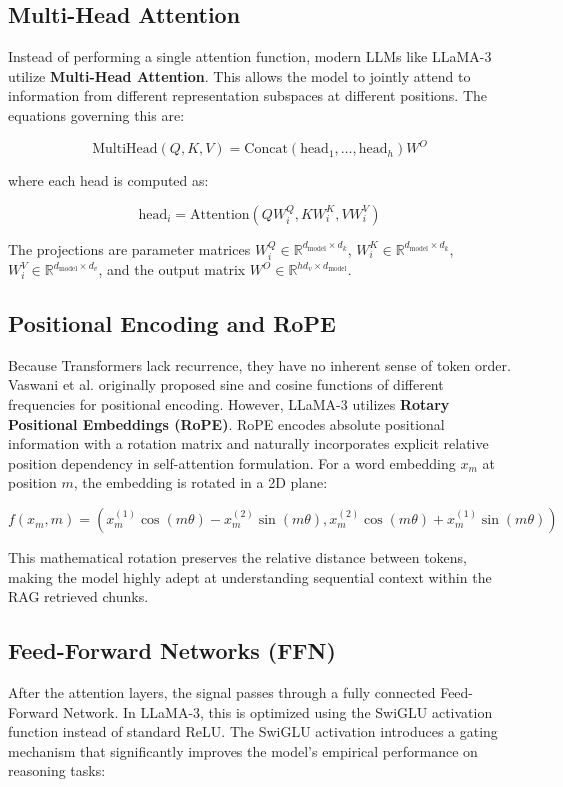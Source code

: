 \documentclass[12pt,a4paper]{report}
\begin{document}
\subsection{Multi-Head Attention}
Instead of performing a single attention function, modern LLMs like LLaMA-3 utilize \textbf{Multi-Head Attention}. This allows the model to jointly attend to information from different representation subspaces at different positions. The equations governing this are:

\begin{equation}
    \text{MultiHead}(Q, K, V) = \text{Concat}(\text{head}_1, \dots, \text{head}_h)W^O
\end{equation}

where each head is computed as:

\begin{equation}
    \text{head}_i = \text{Attention}(QW_i^Q, KW_i^K, VW_i^V)
\end{equation}

The projections are parameter matrices $W_i^Q \in \mathbb{R}^{d_{\text{model}} \times d_k}$, $W_i^K \in \mathbb{R}^{d_{\text{model}} \times d_k}$, $W_i^V \in \mathbb{R}^{d_{\text{model}} \times d_v}$, and the output matrix $W^O \in \mathbb{R}^{hd_v \times d_{\text{model}}}$.

\subsection{Positional Encoding and RoPE}
Because Transformers lack recurrence, they have no inherent sense of token order. Vaswani et al. originally proposed sine and cosine functions of different frequencies for positional encoding. However, LLaMA-3 utilizes \textbf{Rotary Positional Embeddings (RoPE)}. RoPE encodes absolute positional information with a rotation matrix and naturally incorporates explicit relative position dependency in self-attention formulation. For a word embedding $x_m$ at position $m$, the embedding is rotated in a 2D plane:

\begin{equation}
    f(x_m, m) = (x_m^{(1)}\cos(m\theta) - x_m^{(2)}\sin(m\theta), x_m^{(2)}\cos(m\theta) + x_m^{(1)}\sin(m\theta))
\end{equation}

This mathematical rotation preserves the relative distance between tokens, making the model highly adept at understanding sequential context within the RAG retrieved chunks.

\subsection{Feed-Forward Networks (FFN)}
After the attention layers, the signal passes through a fully connected Feed-Forward Network. In LLaMA-3, this is optimized using the SwiGLU activation function instead of standard ReLU. The SwiGLU activation introduces a gating mechanism that significantly improves the model's empirical performance on reasoning tasks:
\end{document}
